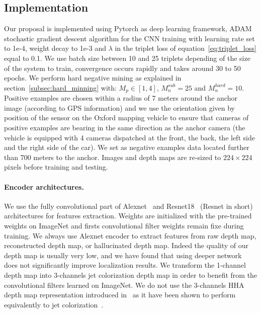 \subsection{Implementation}
\label{subsec:implementation}

Our proposal is implemented using Pytorch as deep learning framework, ADAM stochastic gradient descent algorithm for the CNN training with learning rate set to 1e-4, weight decay to 1e-3 and $\lambda$ in the triplet loss of equation~\ref{eq:triplet_loss} equal to 0.1. We use batch size between 10 and 25 triplets depending of the size of the system to train, convergence occurs rapidly and takes around 30 to 50 epochs. We perform hard negative mining as explained in section~\ref{subsec:hard_minning} with: $M_p \in [1, 4]$, $M_n^{sub} = 25$ and $M_n^{hard} = 10$. Positive examples are chosen within a radius of 7 meters around the anchor image  (according to GPS information) and we use the orientation given by position of the sensor on the Oxford mapping vehicle to ensure that cameras of positive examples are bearing in the same direction as the anchor camera (the vehicle is equipped with 4 cameras dispatched at the front, the back, the left side and the right side of the car). We set as negative examples data located further than 700 meters to the anchor. Images and depth maps are re-sized to $224\times224$ pixels before training and testing. 

\paragraph{Encoder architectures.}
We use the fully convolutional part of Alexnet~\citep{Krizhevsky2012} and Resnet18~\citep{he2016deep} (Resnet in short) architectures for features extraction. Weights are initialized with the pre-trained weights on ImageNet and firsts convolutional filter weights remain fixe during training. We always use Alexnet encoder to extract features from raw depth map, reconstructed depth map, or hallucinated depth map. Indeed the quality of our depth map is usually very low, and we have found that using deeper network does not significantly improve localization results. We transform the 1-channel depth map into 3-channels jet colorization depth map in order to benefit from the convolutional filters learned on ImageNet. We do not use the 3-channels HHA depth map representation introduced in~\cite{Gupta2014} as it have been shown to perform equivalently to jet colorization~\cite{Eitel2015}.

